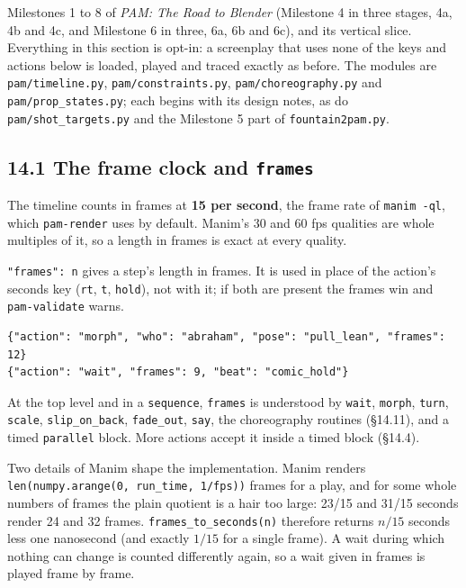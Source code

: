 \documentclass[
  12pt,
  letterpaper,
]{book}
\begin{document}
Milestones 1 to 8 of \emph{PAM: The Road to Blender} (Milestone 4 in
three stages, 4a, 4b and 4c, and Milestone 6 in three, 6a, 6b and 6c),
and its vertical slice. Everything in this section
is opt-in: a screenplay that uses none
of the keys and actions below is loaded, played and traced exactly as
before. The modules are \texttt{pam/timeline.py},
\texttt{pam/constraints.py}, \texttt{pam/choreography.py} and
\texttt{pam/prop\_states.py}; each
begins with its design notes, as do \texttt{pam/shot\_targets.py} and
the Milestone 5 part of \texttt{fountain2pam.py}.

\subsection{\texorpdfstring{14.1 The frame clock and \texttt{frames}}{14.1 The frame clock and frames}}\label{the-frame-clock}

The timeline counts in frames at \textbf{15 per second}, the frame rate
of \texttt{manim -ql}, which \texttt{pam-render} uses by default.
Manim's 30 and 60 fps qualities are whole multiples of it, so a length
in frames is exact at every quality.

\texttt{"frames": n} gives a step's length in frames. It is used in
place of the action's seconds key (\texttt{rt}, \texttt{t},
\texttt{hold}), not with it; if both are present the frames win and
\texttt{pam-validate} warns.

\begin{verbatim}
{"action": "morph", "who": "abraham", "pose": "pull_lean", "frames": 12}
{"action": "wait", "frames": 9, "beat": "comic_hold"}
\end{verbatim}

At the top level and in a \texttt{sequence}, \texttt{frames} is
understood by \texttt{wait}, \texttt{morph}, \texttt{turn},
\texttt{scale}, \texttt{slip\_on\_back}, \texttt{fade\_out},
\texttt{say}, the choreography routines (\S14.11), and a timed
\texttt{parallel} block. More actions accept it inside a timed block
(\S14.4).

Two details of Manim shape the implementation. Manim renders
\texttt{len(numpy.arange(0, run\_time, 1/fps))} frames for a play, and
for some whole numbers of frames the plain quotient is a hair too
large: 23/15 and 31/15 seconds render 24 and 32 frames.
\texttt{frames\_to\_seconds(n)} therefore returns $n/15$ seconds less
one nanosecond (and exactly $1/15$ for a single frame). A wait during
which nothing can change is counted differently again, so a wait given
in frames is played frame by frame.
\end{document}
